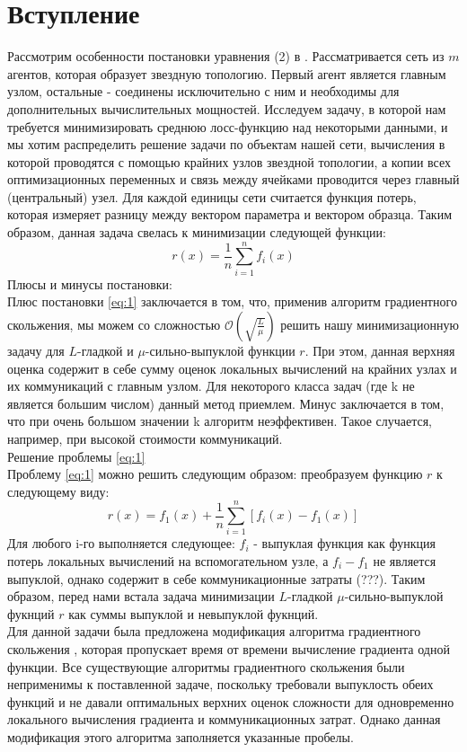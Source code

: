 \documentclass{article}
\begin{document}
\section{Вступление}
Рассмотрим особенности постановки уравнения (2) в \cite{kovalev2022optimal}. Рассматривается сеть из $m$ агентов, которая образует звездную топологию. Первый агент является главным узлом, остальные - соединены исключительно с ним и необходимы для дополнительных вычислительных мощностей. Исследуем задачу, в которой нам требуется минимизировать среднюю лосс-функцию над некоторыми данными, и мы хотим распределить решение задачи по объектам нашей сети, вычисления в которой проводятся с помощью крайних узлов звездной топологии, а копии всех оптимизационных переменных и связь между ячейками проводится через главный (центральный) узел. Для каждой единицы сети считается функция потерь, которая измеряет разницу между вектором параметра и вектором образца. Таким образом, данная задача свелась к минимизации следующей функции: \\
\begin{equation}
    \label{eq:1}
    r(x) = \frac{1}{n} \sum \limits_{i = 1}^{n} f _i(x)
\end{equation}
Плюсы и минусы постановки:\\
Плюс постановки \ref{eq:1} заключается в том, что, применив алгоритм градиентного скольжения, мы можем со сложностью $\mathcal{O}(\sqrt{\frac{L}{\mu}})$ решить нашу минимизационную задачу для $L$-гладкой и $\mu$-сильно-выпуклой функции $r$. При этом, данная верхняя оценка содержит в себе сумму оценок локальных вычислений на крайних узлах и их коммуникаций с главным узлом. Для некоторого класса задач (где k не является большим числом) данный метод приемлем. Минус заключается в том, что при очень большом значении k алгоритм неэффективен. Такое случается, например, при высокой стоимости коммуникаций. \\
Решение проблемы \ref{eq:1}\\
Проблему \ref{eq:1} можно решить следующим образом: преобразуем функцию $r$ к следующему виду:\\
\begin{equation}
    \label{eq:2}
    r(x) = f_1(x) + \frac{1}{n}\sum\limits_{i = 1}^{n}[f_i(x) - f_1(x)]
\end{equation}
Для любого i-го выполняется следующее: $f_i$ - выпуклая функция как функция потерь локальных вычислений на вспомогательном узле, а $f_i - f_1$ не является выпуклой, однако содержит в себе коммуникационные затраты (???). Таким образом, перед нами встала задача минимизации $L$-гладкой $\mu$-сильно-выпуклой фукнций $r$ как суммы выпуклой и невыпуклой фукнций. \\
Для данной задачи была предложена модификация алгоритма градиентного скольжения \cite{kovalev2022optimal}, которая пропускает время от времени вычисление градиента одной функции. Все существующие алгоритмы градиентного скольжения были неприменимы к поставленной задаче, поскольку требовали выпуклость обеих функций и не давали оптимальных верхних оценок сложности для одновременно локального вычисления градиента и коммуникационных затрат. Однако данная модификация этого алгоритма заполняется указанные пробелы.
\end{document}
